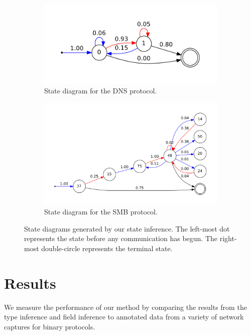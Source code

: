 \documentclass[a4paper]{report}
\begin{document}
\begin{figure}[h]
    \centering
    \begin{subfigure}[b]{0.48\textwidth}
        \includegraphics[width=\textwidth]{img/dnsstate}
        \caption{State diagram for the DNS protocol.}
        \label{fig:dnsstate}
    \end{subfigure}
    \quad
    \begin{subfigure}[b]{0.48\textwidth}
        \includegraphics[width=\textwidth]{img/smbstate}
        \caption{State diagram for the SMB protocol.}
        \label{fig:smbstate}
    \end{subfigure}
    \caption{State diagrams generated by our state inference. The left-most
        dot represents the state before any communication has begun. The
        right-most double-circle represents the terminal state.}
    \label{fig:states}
\end{figure}

\chapter{Results}
We measure the performance of our method by comparing the results from the
type inference and field inference to annotated data from a variety of network
captures for binary protocols.
\end{document}
